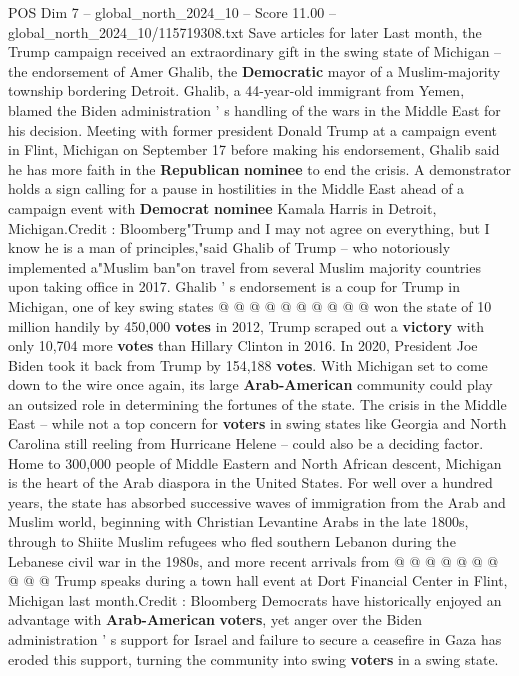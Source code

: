 \begin{textsample}{POS Dim 7 – global\_north\_2024\_10 – Score 11.00 – global\_north\_2024\_10/115719308.txt}  \label{ex:f7_pos_100}
Save articles for later Last month, the Trump campaign received an extraordinary gift in the swing state of Michigan -- the endorsement of Amer Ghalib, the \textbf{Democratic} mayor of a Muslim-majority township bordering Detroit.
Ghalib, a 44-year-old immigrant from Yemen, blamed the Biden administration ' s handling of the wars in the Middle East for his decision.
Meeting with former president Donald Trump at a campaign event in Flint, Michigan on September 17 before making his endorsement, Ghalib said he has more faith in the \textbf{Republican} \textbf{nominee} to end the crisis.
A demonstrator holds a sign calling for a pause in hostilities in the Middle East ahead of a campaign event with \textbf{Democrat} \textbf{nominee} Kamala Harris in Detroit, Michigan.Credit : Bloomberg"Trump and I may not agree on everything, but I know he is a man of principles,"said Ghalib of Trump -- who notoriously implemented a"Muslim ban"on travel from several Muslim majority countries upon taking office in 2017.
Ghalib ' s endorsement is a coup for Trump in Michigan, one of key swing states @ @ @ @ @ @ @ @ @ @ won the state of 10 million handily by 450,000 \textbf{votes} in 2012, Trump scraped out a \textbf{victory} with only 10,704 more \textbf{votes} than Hillary Clinton in 2016.
In 2020, President Joe Biden took it back from Trump by 154,188 \textbf{votes}.
With Michigan set to come down to the wire once again, its large \textbf{Arab-American} community could play an outsized role in determining the fortunes of the state.
The crisis in the Middle East -- while not a top concern for \textbf{voters} in swing states like Georgia and North Carolina still reeling from Hurricane Helene -- could also be a deciding factor.
Home to 300,000 people of Middle Eastern and North African descent, Michigan is the heart of the Arab diaspora in the United States.
For well over a hundred years, the state has absorbed successive waves of immigration from the Arab and Muslim world, beginning with Christian Levantine Arabs in the late 1800s, through to Shiite Muslim refugees who fled southern Lebanon during the Lebanese civil war in the 1980s, and more recent arrivals from @ @ @ @ @ @ @ @ @ @ Trump speaks during a town hall event at Dort Financial Center in Flint, Michigan last month.Credit : Bloomberg Democrats have historically enjoyed an advantage with \textbf{Arab-American} \textbf{voters}, yet anger over the Biden administration ' s support for Israel and failure to secure a ceasefire in Gaza has eroded this support, turning the community into swing \textbf{voters} in a swing state.

\end{textsample}
